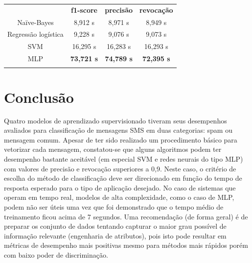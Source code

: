 \documentclass[a4paper,11pt]{article}
\begin{document}
\vspace{.5cm}
\begin{center}
\begin{tabular}{cccc}
 \hline
	        &  \textbf{f1-score}  & \textbf{precisão}  & \textbf{revocação} \\
 Naïve-Bayes	&  8,912 s 	 & 8,971 s  	& 8,949 s \\
 Regressão logística & 9,228 s 	 & 9,076 s  	& 9,073 s  \\
 SVM            &  16,295 s 	 & 16,283 s 	& 16,293 s \\
 MLP 		&  \textbf{73,721 s}  & \textbf{74,789 s}   & \textbf{72,395 s}  \\
 \hline
 \label{tab:tempo}
\end{tabular}
\end{center}




\section{Conclusão}

Quatro modelos de aprendizado supervisionado tiveram seus desempenhos avaliados para classificação
de mensagens SMS em duas categorias: spam ou mensagem comum. Apesar de ter sido realizado um 
procedimento básico para vetorizar cada mensagem, constatou-se que alguns algoritmos podem ter 
desempenho bastante aceitável (em especial SVM e redes neurais do tipo MLP) com valores de 
precisão e revocação superiores a 0,9. Neste caso, o critério de escolha do método de classificação 
deve ser direcionado em função do tempo de resposta esperado para o tipo de aplicação desejado. 
No caso de sistemas que operam em tempo real, modelos de alta complexidade, como o caso de MLP,
podem não ser úteis uma vez que foi demonstrado que o tempo médio de treinamento ficou acima de 
7 segundos. Uma recomendação (de forma geral) é de preparar os conjunto de dados tentando capturar 
o maior grau possível de informação relevante (engenharia de atributos), pois isto pode resultar
em métricas de desempenho mais positivas mesmo para métodos mais rápidos porém com baixo poder de 
discriminação.




 
\end{document}
